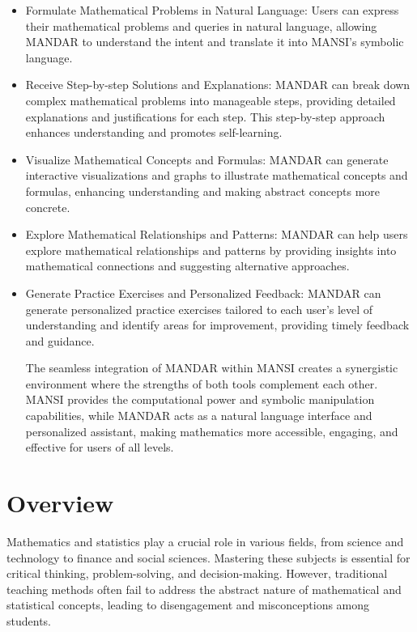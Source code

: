 \documentclass[20pt]{report}
\begin{document}
\begin{itemize}
\item Formulate Mathematical Problems in Natural Language: Users can express their mathematical problems and queries in natural language, allowing MANDAR to understand the intent and translate it into MANSI's symbolic language.

\item Receive Step-by-step Solutions and Explanations: MANDAR can break down complex mathematical problems into manageable steps, providing detailed explanations and justifications for each step. This step-by-step approach enhances understanding and promotes self-learning.

\item Visualize Mathematical Concepts and Formulas: MANDAR can generate interactive visualizations and graphs to illustrate mathematical concepts and formulas, enhancing understanding and making abstract concepts more concrete.

\item Explore Mathematical Relationships and Patterns: MANDAR can help users explore mathematical relationships and patterns by providing insights into mathematical connections and suggesting alternative approaches.

\item Generate Practice Exercises and Personalized Feedback: MANDAR can generate personalized practice exercises tailored to each user's level of understanding and identify areas for improvement, providing timely feedback and guidance.

The seamless integration of MANDAR within MANSI creates a synergistic environment where the strengths of both tools complement each other. MANSI provides the computational power and symbolic manipulation capabilities, while MANDAR acts as a natural language interface and personalized assistant, making mathematics more accessible, engaging, and effective for users of all levels.
\end{itemize}
\section{Overview}
Mathematics and statistics play a crucial role in various fields, from science and technology to finance and social sciences. Mastering these subjects is essential for critical thinking, problem-solving, and decision-making. However, traditional teaching methods often fail to address the abstract nature of mathematical and statistical concepts, leading to disengagement and misconceptions among students.
\end{document}
